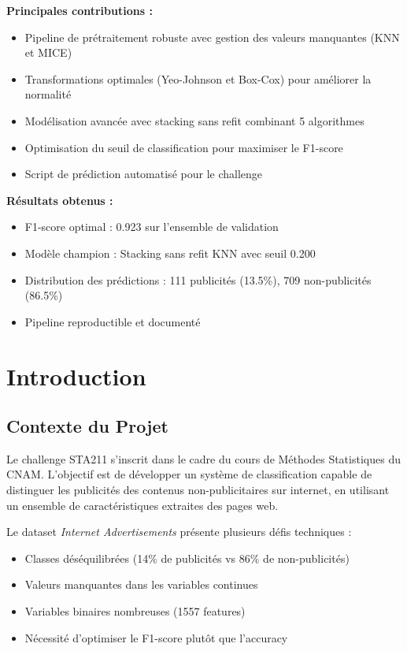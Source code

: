 \documentclass[12pt,a4paper]{article}
\begin{document}
\textbf{Principales contributions :}
\begin{itemize}
    \item Pipeline de prétraitement robuste avec gestion des valeurs manquantes (KNN et MICE)
    \item Transformations optimales (Yeo-Johnson et Box-Cox) pour améliorer la normalité
    \item Modélisation avancée avec stacking sans refit combinant 5 algorithmes
    \item Optimisation du seuil de classification pour maximiser le F1-score
    \item Script de prédiction automatisé pour le challenge
\end{itemize}

\textbf{Résultats obtenus :}
\begin{itemize}
    \item F1-score optimal : 0.923 sur l'ensemble de validation
    \item Modèle champion : Stacking sans refit KNN avec seuil 0.200
    \item Distribution des prédictions : 111 publicités (13.5\%), 709 non-publicités (86.5\%)
    \item Pipeline reproductible et documenté
\end{itemize}

\section{Introduction}

\subsection{Contexte du Projet}

Le challenge STA211 s'inscrit dans le cadre du cours de Méthodes Statistiques du CNAM. L'objectif est de développer un système de classification capable de distinguer les publicités des contenus non-publicitaires sur internet, en utilisant un ensemble de caractéristiques extraites des pages web.

Le dataset \textit{Internet Advertisements} présente plusieurs défis techniques :
\begin{itemize}
    \item Classes déséquilibrées (14\% de publicités vs 86\% de non-publicités)
    \item Valeurs manquantes dans les variables continues
    \item Variables binaires nombreuses (1557 features)
    \item Nécessité d'optimiser le F1-score plutôt que l'accuracy
\end{itemize}
\end{document}
